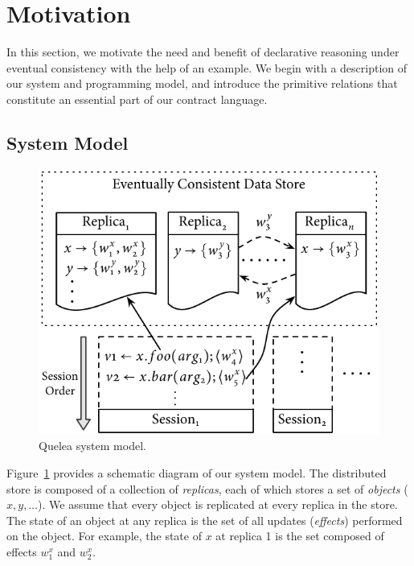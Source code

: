 \section{Motivation}
\label{sec:motivation}

In this section, we motivate the need and benefit of declarative reasoning under
eventual consistency with the help of an example. We begin with a description of
our system and programming model, and introduce the primitive relations that
constitute an essential part of our contract language.

\subsection{System Model}
\label{sec:sysmod}

\begin{figure}
\centering
\includegraphics[width=\columnwidth]{Figures/SystemModel}
\caption{Quelea system model.}
\label{fig:sysmod}
\end{figure}

Figure~\ref{fig:sysmod} provides a schematic diagram of our system model. The
distributed store is composed of a collection of \emph{replicas}, each of which
stores a set of \emph{objects} ($x,y,\ldots$). We assume that every object is
replicated at every replica in the store. The state of an object at any replica
is the set of all updates (\emph{effects}) performed on the object. For
example, the state of $x$ at replica 1 is the set composed of effects $w^x_1$
and $w^x_2$.

